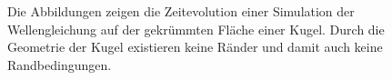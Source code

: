 \documentclass[crop=false]{standalone}
\begin{document}
\begin{figure}[h]
\begin{subfigure}[b]{0.24\textwidth}
        \caption{}
      \end{subfigure}
      \caption[Wellensimulation auf einer Kugel]{%
        Die Abbildungen zeigen die Zeitevolution einer Simulation der Wellengleichung auf der gekrümmten Fläche einer Kugel.
        Durch die Geometrie der Kugel existieren keine Ränder und damit auch keine Randbedingungen.
      }
      \label{fig:sphere-wave}
    \end{figure}

\end{document}

